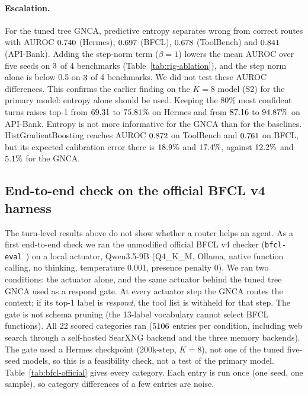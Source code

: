 \documentclass[10pt]{article}
\begin{document}
\paragraph{Escalation.} For the tuned tree GNCA, predictive entropy separates wrong from correct routes with AUROC $0.740$ (Hermes), $0.697$ (BFCL), $0.678$ (ToolBench) and $0.841$ (API-Bank). Adding the step-norm term ($\beta{=}1$) lowers the mean AUROC over five seeds on $3$ of 4 benchmarks (Table~\ref{tab:rig-ablation}), and the step norm alone is below 0.5 on $3$ of 4 benchmarks. We did not test these AUROC differences. This confirms the earlier finding on the $K{=}8$ model (S2) for the primary model: entropy alone should be used. Keeping the 80\% most confident turns raises top-1 from $69.31$ to $75.81\%$ on Hermes and from $87.16$ to $94.87\%$ on API-Bank. Entropy is not more informative for the GNCA than for the baselines. HistGradientBoosting reaches AUROC $0.872$ on ToolBench and $0.761$ on BFCL, but its expected calibration error there is $18.9\%$ and $17.4\%$, against $12.2\%$ and $5.1\%$ for the GNCA.

\subsection{End-to-end check on the official BFCL v4 harness}\label{sec:bfcl-official}
The turn-level results above do not show whether a router helps an agent. As a first end-to-end check we ran the unmodified official BFCL v4 checker (\texttt{bfcl-eval}~\citep{bfcl-eval}) on a local actuator, Qwen3.5-9B (Q4\_K\_M, Ollama, native function calling, no thinking, temperature 0.001, presence penalty 0). We ran two conditions: the actuator alone, and the same actuator behind the tuned tree GNCA used as a respond gate. At every actuator step the GNCA routes the context; if its top-1 label is \emph{respond}, the tool list is withheld for that step. The gate is not schema pruning (the 13-label vocabulary cannot select BFCL functions). All 22 scored categories ran ($5106$ entries per condition, including web search through a self-hosted SearXNG backend and the three memory backends). The gate used a Hermes checkpoint (200k-step, $K{=}8$), not one of the tuned five-seed models, so this is a feasibility check, not a test of the primary model. Table~\ref{tab:bfcl-official} gives every category. Each entry is run once (one seed, one sample), so category differences of a few entries are noise.
\end{document}
